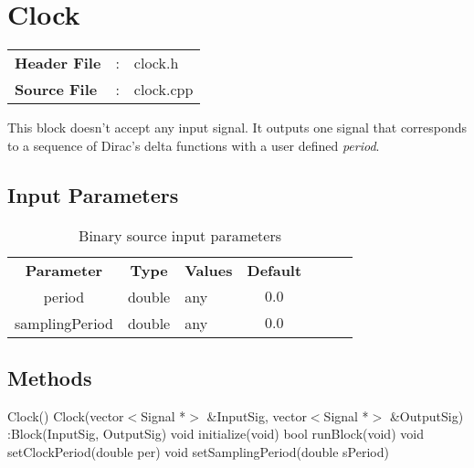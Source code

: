 \clearpage

\section{Clock}

\begin{tcolorbox}	
	\begin{tabular}{p{2.75cm} p{0.2cm} p{10.5cm}} 	
		\textbf{Header File}   &:& clock.h \\
		\textbf{Source File}   &:& clock.cpp \\
	\end{tabular}
\end{tcolorbox}

This block doesn't accept any input signal. It outputs one signal that corresponds to a sequence of Dirac's delta functions with a user defined \textit{period}.

\subsection*{Input Parameters}


\begin{table}[h]
	\centering
	\begin{tabular}{|c|c|p{60mm}|c|ccp{60mm}}
		\cline{1-4}
		\textbf{Parameter} & \textbf{Type} & \textbf{Values} &   \textbf{Default}& \\ \cline{1-4}
		period & double & any & $0.0$ \\ \cline{1-4}
		samplingPeriod & double & any & $0.0$ \\ \cline{1-4}
	\end{tabular}
	\caption{Binary source input parameters}
	\label{table:clock_in_par}
\end{table}

\subsection*{Methods}

Clock() {}
\bigbreak
Clock(vector$<$Signal *$>$ \&InputSig, vector$<$Signal *$>$ \&OutputSig) :Block(InputSig, OutputSig) {}
\bigbreak
void initialize(void)
\bigbreak
bool runBlock(void)
\bigbreak
void setClockPeriod(double per)
\bigbreak
void setSamplingPeriod(double sPeriod)

